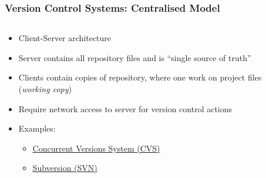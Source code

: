 \begin{frame}[fragile]
\frametitle{Version Control Systems: Centralised Model}
\begin{columns}[T]
    \begin{column}{0.7\textwidth}
        \begin{itemize}
            \item Client-Server architecture
            \item Server contains all repository files and is ``single source of truth''
            \item Clients contain copies of repository, where one work on project
                files (\emph{working copy})
            \item Require network access to server for version control actions
            \item Examples:
            \begin{itemize}
                \item \href{https://en.wikipedia.org/wiki/Concurrent_Versions_System}
                           {Concurrent Versions System (CVS)}
                \item \href{https://en.wikipedia.org/wiki/Apache_Subversion}
                           {Subversion (SVN)}
            \end{itemize}
        \end{itemize}
    \end{column}
    \begin{column}{0.4\textwidth}
        \begin{center}
        \resizebox{\textwidth}{!}{}
        \end{center}
    \end{column}
\end{columns}
\end{frame}

